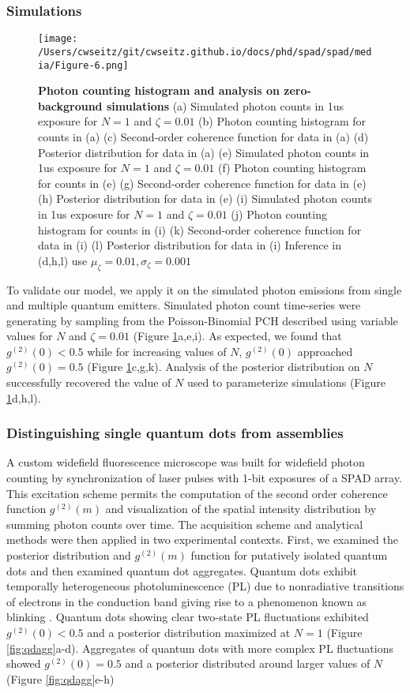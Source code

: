 \subsubsection{Simulations}

\begin{figure}
\centering
\texttt{[image: /Users/cwseitz/git/cwseitz.github.io/docs/phd/spad/spad/media/Figure-6.png]}
\caption{\textbf{Photon counting histogram and analysis on zero-background simulations} (a) Simulated photon counts in 1us exposure for $N=1$ and $\zeta=0.01$ (b) Photon counting histogram for counts in (a) (c) Second-order coherence function for data in (a) (d) Posterior distribution for data in (a) (e) Simulated photon counts in 1us exposure for $N=1$ and $\zeta=0.01$ (f) Photon counting histogram for counts in (e) (g) Second-order coherence function for data in (e) (h) Posterior distribution for data in (e) (i) Simulated photon counts in 1us exposure for $N=1$ and $\zeta=0.01$ (j) Photon counting histogram for counts in (i) (k) Second-order coherence function for data in (i) (l) Posterior distribution for data in (i) Inference in (d,h,l) use $\mu_\zeta=0.01,\sigma_\zeta=0.001$}
\label{fig:pch}
\end{figure}  

To validate our model, we apply it on the simulated photon emissions from single and multiple quantum emitters. Simulated photon count time-series were generating by sampling from the Poisson-Binomial PCH described using variable values for $N$ and $\zeta=0.01$ (Figure \ref{fig:pch}a,e,i). As expected, we found that $g^{(2)}(0)<0.5$  while for increasing values of $N$, $g^{(2)}(0)$ approached $g^{(2)}(0)=0.5$ (Figure \ref{fig:pch}c,g,k). Analysis of the posterior distribution on $N$ successfully recovered the value of $N$ used to parameterize simulations (Figure \ref{fig:pch}d,h,l). 

\subsubsection{Distinguishing single quantum dots from assemblies}

A custom widefield fluorescence microscope was built for widefield photon counting by synchronization of laser pulses with 1-bit exposures of a SPAD array. This excitation scheme permits the computation of the second order coherence function  $g^{(2)}(m)$ and visualization of the spatial intensity distribution by summing photon counts over time. The acquisition scheme and analytical methods were then applied in two experimental contexts. First, we examined the posterior distribution and $g^{(2)}(m)$ function for putatively isolated quantum dots and then examined quantum dot aggregates. Quantum dots exhibit temporally heterogeneous photoluminescence (PL) due to nonradiative transitions of electrons in the conduction band giving rise to a phenomenon known as blinking \parencite{Stoler1985,Furuta2022}. Quantum dots showing clear two-state PL fluctuations exhibited $g^{(2)}(0)<0.5$ and a posterior distribution maximized at $N=1$ (Figure \ref{fig:qdagg}a-d). Aggregates of quantum dots with more complex PL fluctuations showed $g^{(2)}(0)=0.5$ and a posterior distributed around larger values of $N$ (Figure \ref{fig:qdagg}e-h) 

